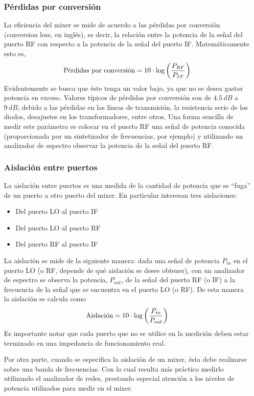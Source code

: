 \documentclass[a4paper,10pt]{article}
\begin{document}
		\subsubsection{P\'erdidas por conversi\'on}
		\indent La eficiencia del mixer se mide de acuerdo a las p\'erdidas por conversi\'on (conversion loss, en ingl\'es), es decir, la 
		relación entre la potencia de la señal del puerto RF con respecto a la potencia de la señal del puerto IF. Matem\'aticamente esto es,
		$$\textmd{P\'erdidas por conversi\'on}=10\cdot\log\left(\frac{P_{RF}}{P_{IF}}\right)$$
		Evidentemente se busca que \'este tenga un valor bajo, ya que no se desea gastar potencia en exceso. Valores t\'ipicos de p\'erdidas por conversi\'on son de $4.5~dB$ a $9~dB$, debido a las p\'erdidas en las l\'ineas de transmisi\'on, la resistencia serie de los diodos, desajustes en los transformadores, entre otros.
		Una forma sencilla de medir este par\'ametro es colocar en el puerto RF una señal de potencia conocida (proporcionada por un sintetizador de frecuencias, por ejemplo) y utilizando un analizador de espectro observar la potencia de la señal del puerto RF.
		
		\subsubsection{Aislación entre puertos}
		La aislación entre puertos es una medida de la cantidad de potencia que se ``fuga'' de un puerto a otro puerto del mixer.
		En particular interesan tres aislaciones:
		\begin{itemize}
		\item Del puerto LO al puerto IF
		\item Del puerto LO al puerto RF
		\item Del puerto RF al puerto IF
		\end{itemize}
		La aislaci\'on se mide de la siguiente manera: dada una se\~nal de potencia $P_{in}$ en el puerto LO (o RF, depende de qu\'e aislaci\'on se desee obtener), con un analizador de espectro se observa la potencia, $P_{out}$, de la señal del puerto RF (o IF) a la frecuencia de la señal que se encuentra en el puerto LO (o RF). De esta manera la aislaci\'on se calcula como		$$\textmd{Aislaci\'on}=10\cdot\log\left(\frac{P_{in}}{P_{out}}\right)$$
		Es importante notar que cada puerto que no se utilice en la medici\'on deben estar terminado en una impedancia de funcionamiento real.
		
		Por otra parte, cuando se especifica la aislaci\'on de un mixer, \'esta debe realizarse sobre una banda de frecuencias. Con lo cual resulta m\'as pr\'actico medirlo utilizando el analizador de redes, prestando especial atenci\'on a los niveles de potencia utilizados para medir en el mixer.
\end{document}
